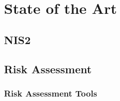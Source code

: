 
%

\chapter{State of the Art}
\label{cha:state_of_the_art}

\section{NIS2}
\label{sec:nis2}

\section{Risk Assessment}
\label{sec:risk_assessment}

\subsection{Risk Assessment Tools}
\label{sub:tools}


